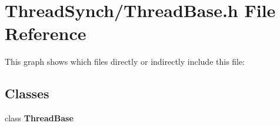 \section{Thread\-Synch/Thread\-Base.h File Reference}
\label{_thread_base_8h}


This graph shows which files directly or indirectly include this file:\subsection*{Classes}
\begin{CompactItemize}
\item 
class {\bf Thread\-Base}
\end{CompactItemize}
